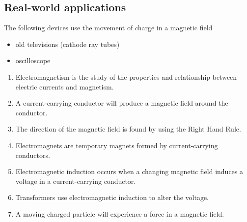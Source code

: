 \subsection{Real-world applications}
The following devices use the movement of charge in a magnetic field
\begin{itemize}
\item old televisions (cathode ray tubes)
\item oscilloscope
\end{itemize}



\begin {enumerate}
\item Electromagnetism is the study of the properties and relationship between electric currents and magnetism.
\item A current-carrying conductor will produce a magnetic field around the conductor.
\item The direction of the magnetic field is found by using the Right Hand Rule.
\item Electromagnets are temporary magnets formed by current-carrying conductors.
\item Electromagnetic induction occurs when a changing magnetic field induces a voltage in a current-carrying conductor.
\item Transformers use electromagnetic induction to alter the voltage.
\item A moving charged particle will experience a force in a magnetic field.
\end {enumerate}

